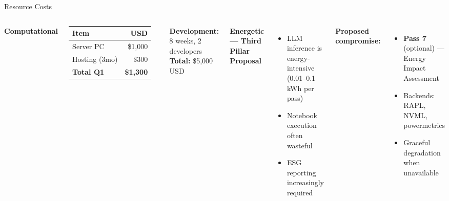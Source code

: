 \documentclass[11pt, aspectratio=169]{beamer}
\begin{document}
\begin{frame}{Resource Costs}
  \centering
  \begin{columns}[T]
      \textbf{Computational}
      \begin{table}\footnotesize
        \renewcommand{\arraystretch}{1.1}
        \begin{tabularx}{\textwidth}{l r}
          \toprule
          \textbf{Item} & \textbf{USD} \\
          \midrule
          Server PC & \$1{,}000 \\
          Hosting (3mo) & \$300 \\
          \midrule
          \textbf{Total Q1} & \textbf{\$1{,}300} \\
          \bottomrule
        \end{tabularx}
      \end{table}

      \vspace{0.05cm}
      \textbf{Development:} 8 weeks, 2 developers \hfill \textbf{Total:} \alert{\$5,000 USD}

      \textbf{Energetic --- Third Pillar Proposal}
      \begin{itemize}\footnotesize
        \item LLM inference is energy-intensive (0.01--0.1 kWh per pass)
        \item Notebook execution often wasteful
        \item ESG reporting increasingly required
      \end{itemize}

      \vspace{0.1cm}
      \textbf{Proposed compromise:}
      \begin{itemize}\footnotesize
        \item \textbf{Pass 7} (optional) --- Energy Impact Assessment
        \item Backends: RAPL, NVML, powermetrics
        \item Graceful degradation when unavailable
      \end{itemize}
  \end{columns}
\end{frame}
\end{document}
